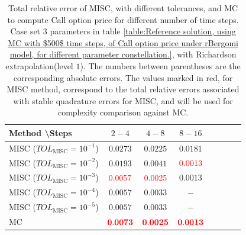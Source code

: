 \begin{table}[h!]
	\centering
	\begin{tabular}{l*{6}{c}r}
		Method \textbackslash  Steps           & $2-4$ & $4-8$ & $8-16$  \\
		\hline
		MISC ($TOL_{\text{MISC}}=10^{-1}$)  &$0.0273$  &$0.0225$ & $0.0181$  \\
			MISC ($TOL_{\text{MISC}}=10^{-2}$)  & $0.0193$  & $0.0041$ & ${\color{red}0.0013}$  \\
		MISC ($TOL_{\text{MISC}}=10^{-3}$)  & ${\color{red}0.0057}$  & ${\color{red}0.0025}$ & $0.0013$  \\
		MISC ($TOL_{\text{MISC}}=10^{-4}$)    &$0.0057$  & $0.0033$  & $-$  \\
			MISC ($TOL_{\text{MISC}}=10^{-5}$)    &$0.0057$   &  $0.0033$ & $-$  \\	
	\hline

		MC    & ${\color{red}\mathbf{0.0073}}$  &   ${\color{red}\mathbf{0.0025}}$  &  ${\color{red}\mathbf{0.0013}}$  \\
		\hline
	\end{tabular}
	\caption{Total relative error of MISC, with different tolerances, and MC to compute Call option price  for different number of time steps. Case set $3$ parameters in table \ref{table:Reference solution, using MC with $500$ time steps, of Call option price under rBergomi model, for different parameter constellation.}, with Richardson extrapolation(level $1$). The numbers between parentheses are the corresponding absolute errors. The values marked in red, for MISC method, correspond to the total relative errors associated with  stable quadrature errors for MISC, and will be used for complexity comparison against MC.}
	\label{Total  error of MISC and MC to compute Call option price of the different tolerances for different number of time steps. Case set $3$ parameters, with Richardson extrapolation(level $1$). The numbers between parentheses are the corresponding absolute errors.}
\end{table}



